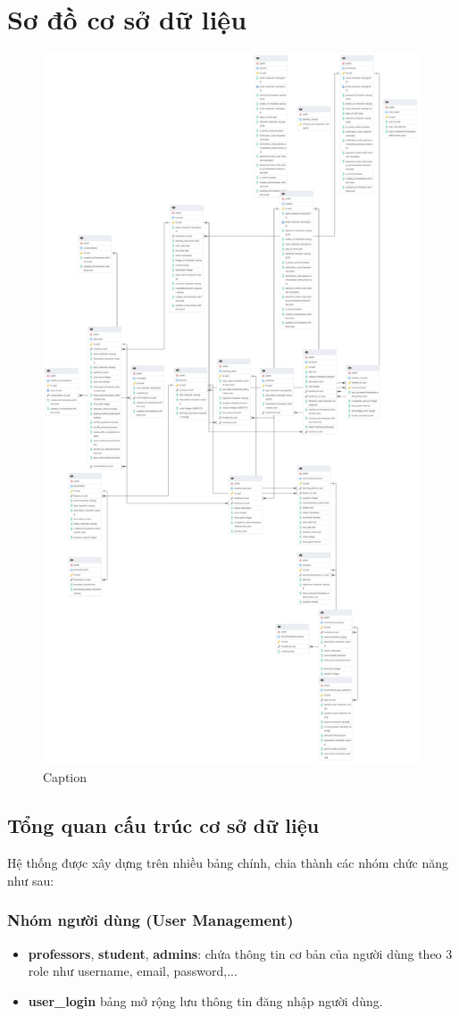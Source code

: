 \section{Sơ đồ cơ sở dữ liệu}
\begin{figure}[H]
    \centering
    \includegraphics[width=0.6\linewidth]{images/ERD.png}
    \caption{Caption}
    \label{fig:enter-label}
\end{figure}

\subsection{Tổng quan cấu trúc cơ sở dữ liệu}
Hệ thống được xây dựng trên nhiều bảng chính, chia thành các nhóm chức năng như sau:

\subsubsection{Nhóm người dùng (User Management)}
\begin{itemize}
    \item \textbf{professors}, \textbf{student}, \textbf{admins}: chứa thông tin cơ bản của người dùng theo 3 role như username, email, password,...
    \item \textbf{user\_login}\: bảng mở rộng lưu thông tin đăng nhập người dùng.
\end{itemize}

